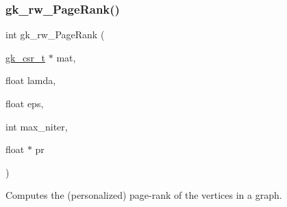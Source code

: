 \subsubsection{\texorpdfstring{gk\+\_\+rw\+\_\+\+Page\+Rank()}{gk\_rw\_PageRank()}}
{\footnotesize\ttfamily int gk\+\_\+rw\+\_\+\+Page\+Rank (\begin{DoxyParamCaption}\item[{\hyperlink{a00634}{gk\+\_\+csr\+\_\+t} $\ast$}]{mat,  }\item[{float}]{lamda,  }\item[{float}]{eps,  }\item[{int}]{max\+\_\+niter,  }\item[{float $\ast$}]{pr }\end{DoxyParamCaption})}

Computes the (personalized) page-\/rank of the vertices in a graph.


